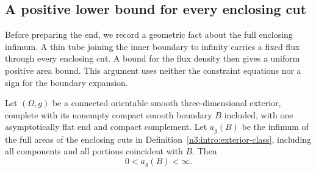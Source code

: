 \subsection{A positive lower bound for every enclosing cut}

Before preparing the end, we record a geometric fact about the full
enclosing infimum. A thin tube joining the inner boundary to infinity
carries a fixed flux through every enclosing cut. A bound for the
flux density then gives a uniform positive area bound. This argument
uses neither the constraint equations nor a sign for the boundary
expansion.

\begin{lemma}
\label{bridge:bridge:positive-area}
Let $(\Omega,g)$ be a connected orientable smooth three-dimensional exterior,
complete with its nonempty compact smooth boundary $B$ included, with
one asymptotically flat end and compact complement. Let $a_g(B)$ be
the infimum of the full areas of the enclosing cuts in
Definition~\ref{n3:intro:exterior-class}, including all components and
all portions coincident with $B$. Then
\[
                         0<a_g(B)<\infty.
\]
\end{lemma}

